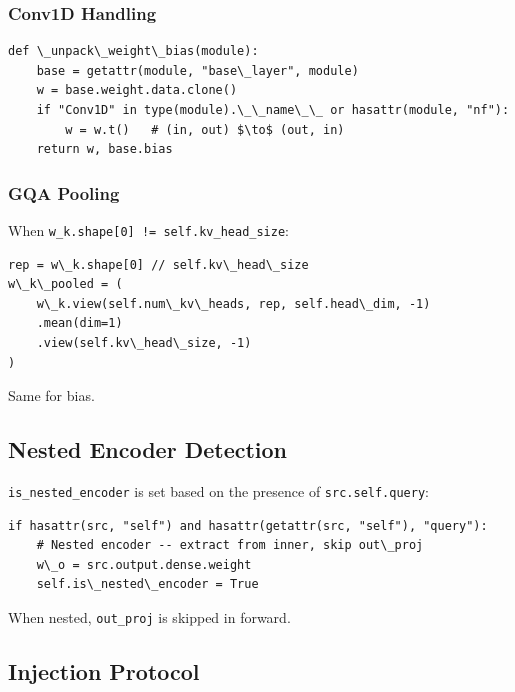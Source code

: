\subsubsection{Conv1D Handling}

\begin{lstlisting}
def \_unpack\_weight\_bias(module):
    base = getattr(module, "base\_layer", module)
    w = base.weight.data.clone()
    if "Conv1D" in type(module).\_\_name\_\_ or hasattr(module, "nf"):
        w = w.t()   # (in, out) $\to$ (out, in)
    return w, base.bias
\end{lstlisting}

\subsubsection{GQA Pooling}

When \texttt{w\_k.shape[0] != self.kv\_head\_size}:

\begin{lstlisting}
rep = w\_k.shape[0] // self.kv\_head\_size
w\_k\_pooled = (
    w\_k.view(self.num\_kv\_heads, rep, self.head\_dim, -1)
    .mean(dim=1)
    .view(self.kv\_head\_size, -1)
)
\end{lstlisting}

Same for bias.

\subsection{Nested Encoder Detection}

\texttt{is\_nested\_encoder} is set based on the presence of \texttt{src.self.query}:

\begin{lstlisting}
if hasattr(src, "self") and hasattr(getattr(src, "self"), "query"):
    # Nested encoder -- extract from inner, skip out\_proj
    w\_o = src.output.dense.weight
    self.is\_nested\_encoder = True
\end{lstlisting}

When nested, \texttt{out\_proj} is skipped in forward.

\subsection{Injection Protocol}

